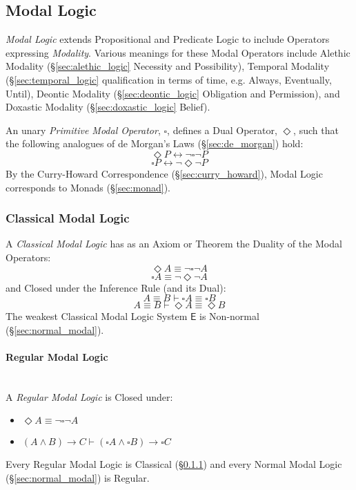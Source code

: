 \subsection{Modal Logic}\label{sec:modal_logic}

\emph{Modal Logic} extends Propositional and Predicate Logic to
include Operators expressing \emph{Modality}. Various meanings for
these Modal Operators include Alethic Modality
(\S\ref{sec:alethic_logic} Necessity and Possibility), Temporal
Modality (\S\ref{sec:temporal_logic} qualification in terms of time,
e.g. Always, Eventually, Until), Deontic Modality
(\S\ref{sec:deontic_logic} Obligation and Permission), and Doxastic
Modality (\S\ref{sec:doxastic_logic} Belief).

An unary \emph{Primitive Modal Operator}, $\square$, defines a Dual
Operator, $\Diamond$, such that the following analogues of de Morgan's
Laws (\S\ref{sec:de_morgan}) hold:
\[
  \Diamond P \leftrightarrow \neg \square \neg P
\]
\[
  \square P \leftrightarrow \neg \Diamond \neg P
\]
By the Curry-Howard Correspondence (\S\ref{sec:curry_howard}), Modal
Logic corresponds to Monads (\S\ref{sec:monad}).



\subsubsection{Classical Modal Logic}\label{sec:classical_modal}

A \emph{Classical Modal Logic} has as an Axiom or Theorem the Duality
of the Modal Operators:
\[
  \Diamond A \equiv \neg \square \neg A
\]\[
  \square A \equiv \neg \Diamond \neg A
\]
and Closed under the Inference Rule (and its Dual):
\[
  A \equiv B \vdash \square A \equiv \square B
\]\[
  A \equiv B \vdash \Diamond A \equiv \Diamond B
\]
The weakest Classical Modal Logic System $\mathsf{E}$ is Non-normal
(\S\ref{sec:normal_modal}).



\paragraph{Regular Modal Logic}\label{sec:regular_modal}
\hfill \\

A \emph{Regular Modal Logic} is Closed under:
\begin {itemize}

\item $\Diamond A \equiv \neg \square \neg A$

\item $(A \wedge B) \rightarrow C \vdash
  (\square A \wedge \square B) \rightarrow \square C$

\end {itemize}
Every Regular Modal Logic is Classical (\S\ref{sec:classical_modal})
and every Normal Modal Logic (\S\ref{sec:normal_modal}) is Regular.



